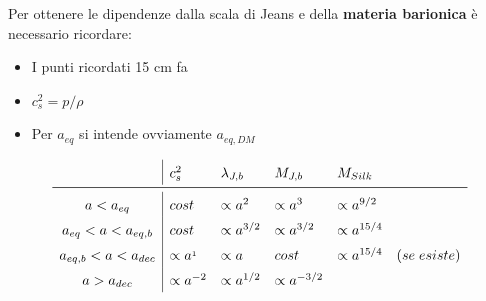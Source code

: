 \vspace{2em}
Per ottenere le dipendenze dalla scala di Jeans e della \textbf{materia barionica} è necessario ricordare:
\begin{itemize}
    \item I punti ricordati 15 cm fa
    \item $c_s^2=p/\rho$
    \item Per $a_{eq}$ si intende ovviamente $a_{eq,DM}$
\end{itemize}
\begin{equation}\left.
    \def\arraystretch{1.5}
        \begin{array}{c|lllll}
             & c_s^2 & \lambda_{J,b} & M_{J,b} & M_{Silk} & \\ \midrule
        a<a_{eq} & cost & \propto a^2 & \propto a^3 & \propto a^{9/2} &\\
        a_{eq} < a<a_{eq,b} & cost &  \propto a^{3/2} & \propto a^{3/2} & \propto a^{15/4} & \\
        a_{eq,b} < a < a_{dec} & \propto a^{_1} & \propto a & cost & \propto a^{15/4} & (se\; esiste) \\
        a > a_{dec} & \propto a^{-2} & \propto a^{1/2} & \propto a^{-3/2} & &
    \end{array}\right.  \label{tab:7jbar}
\end{equation}
